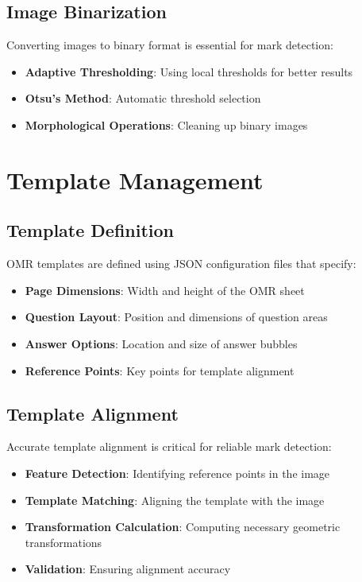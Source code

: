 \subsection{Image Binarization}

Converting images to binary format is essential for mark detection:

\begin{itemize}
\item \textbf{Adaptive Thresholding}: Using local thresholds for better results
\item \textbf{Otsu's Method}: Automatic threshold selection
\item \textbf{Morphological Operations}: Cleaning up binary images
\end{itemize}

\section{Template Management}

\subsection{Template Definition}

OMR templates are defined using JSON configuration files that specify:

\begin{itemize}
\item \textbf{Page Dimensions}: Width and height of the OMR sheet
\item \textbf{Question Layout}: Position and dimensions of question areas
\item \textbf{Answer Options}: Location and size of answer bubbles
\item \textbf{Reference Points}: Key points for template alignment
\end{itemize}

\subsection{Template Alignment}

Accurate template alignment is critical for reliable mark detection:

\begin{itemize}
\item \textbf{Feature Detection}: Identifying reference points in the image
\item \textbf{Template Matching}: Aligning the template with the image
\item \textbf{Transformation Calculation}: Computing necessary geometric transformations
\item \textbf{Validation}: Ensuring alignment accuracy
\end{itemize}

